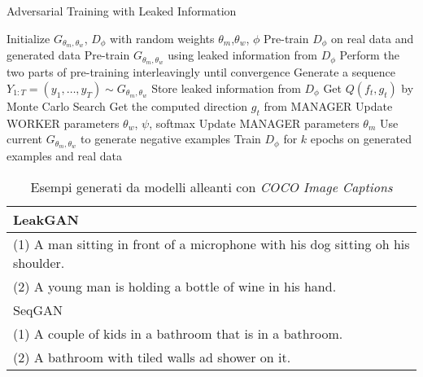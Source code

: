 \begin{algorithm}
  \caption{Adversarial Training with Leaked Information}
  \label{alg:LeakGAN}
  \begin{algorithmic}[1]
    \State Initialize $G_{\theta_m, \theta_w}$, $D_\phi$ with random weights $\theta_m$,$\theta_w$, $\phi$
    \State Pre-train $D_\phi$ on real data and generated data
    \State Pre-train $G_{\theta_m, \theta_w}$ using leaked information from $D_\phi$
    \State Perform the two parts of pre-training interleavingly until convergence
    \Repeat
        \State Generate a sequence $Y_{1:T} = (y_1, \dots, y_T) \sim G_{\theta_m, \theta_w}$
          \State Store leaked information from $D_\phi$
          \State Get $Q(f_t, g_t)$ by Monte Carlo Search
          \State Get the computed direction $g_t$ from MANAGER
          \State Update WORKER parameters $\theta_w$, $\psi$, softmax
          \State Update MANAGER parameters $\theta_m$
        \EndFor
      \EndFor
        \State Use current $G_{\theta_m, \theta_w}$ to generate negative examples
        \State Train $D_\phi$ for $k$ epochs on generated examples and real data
      \EndFor
  \end{algorithmic}
\end{algorithm}

\begin{table}[ht]
\centering
\begin{tabular}{|l|} 
\hline
LeakGAN  \\
\hline
(1) A man sitting in front of a microphone with his dog sitting oh his shoulder. \\
(2) A young man is holding a bottle of wine in his hand.  \\
\hline
SeqGAN \\
\hline
(1) A couple of kids in a bathroom that is in a bathroom. \\
(2) A bathroom with tiled walls ad shower on it. \\
\hline
\end{tabular}
\caption{Esempi generati da modelli alleanti con \emph{COCO Image Captions}}
\label{tab:esempi}
\end{table}

